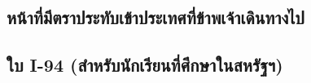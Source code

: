 \documentclass[a4paper,13pt]{article}
\begin{document}
\newpage
\subsection{หน้าที่มีตราประทับเข้าประเทศที่ข้าพเจ้าเดินทางไป}
% 
% 

\newpage
\subsection{ใบ I-94 (สำหรับนักเรียนที่ศึกษาในสหรัฐฯ)}
% 
% 
\end{document}
